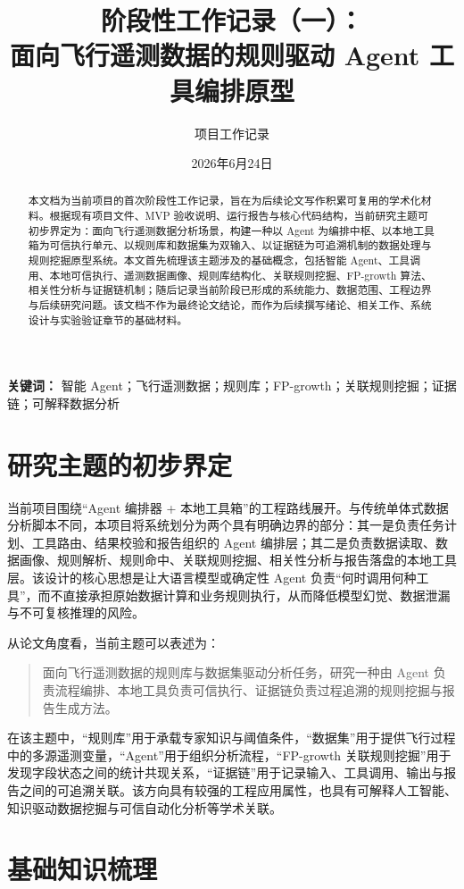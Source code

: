 \documentclass[UTF8,a4paper,zihao=-4]{ctexart}
\title{阶段性工作记录（一）：\\面向飞行遥测数据的规则驱动 Agent 工具编排原型}
\author{项目工作记录}
\date{2026年6月24日}
\begin{document}
\maketitle

\begin{abstract}
本文档为当前项目的首次阶段性工作记录，旨在为后续论文写作积累可复用的学术化材料。根据现有项目文件、MVP 验收说明、运行报告与核心代码结构，当前研究主题可初步界定为：面向飞行遥测数据分析场景，构建一种以 Agent 为编排中枢、以本地工具箱为可信执行单元、以规则库和数据集为双输入、以证据链为可追溯机制的数据处理与规则挖掘原型系统。本文首先梳理该主题涉及的基础概念，包括智能 Agent、工具调用、本地可信执行、遥测数据画像、规则库结构化、关联规则挖掘、FP-growth 算法、相关性分析与证据链机制；随后记录当前阶段已形成的系统能力、数据范围、工程边界与后续研究问题。该文档不作为最终论文结论，而作为后续撰写绪论、相关工作、系统设计与实验验证章节的基础材料。
\end{abstract}

\noindent\textbf{关键词：} 智能 Agent；飞行遥测数据；规则库；FP-growth；关联规则挖掘；证据链；可解释数据分析

\section{研究主题的初步界定}

当前项目围绕“Agent 编排器 + 本地工具箱”的工程路线展开。与传统单体式数据分析脚本不同，本项目将系统划分为两个具有明确边界的部分：其一是负责任务计划、工具路由、结果校验和报告组织的 Agent 编排层；其二是负责数据读取、数据画像、规则解析、规则命中、关联规则挖掘、相关性分析与报告落盘的本地工具层。该设计的核心思想是让大语言模型或确定性 Agent 负责“何时调用何种工具”，而不直接承担原始数据计算和业务规则执行，从而降低模型幻觉、数据泄漏与不可复核推理的风险。

从论文角度看，当前主题可以表述为：
\begin{quote}
面向飞行遥测数据的规则库与数据集驱动分析任务，研究一种由 Agent 负责流程编排、本地工具负责可信执行、证据链负责过程追溯的规则挖掘与报告生成方法。
\end{quote}

在该主题中，“规则库”用于承载专家知识与阈值条件，“数据集”用于提供飞行过程中的多源遥测变量，“Agent”用于组织分析流程，“FP-growth 关联规则挖掘”用于发现字段状态之间的统计共现关系，“证据链”用于记录输入、工具调用、输出与报告之间的可追溯关联。该方向具有较强的工程应用属性，也具有可解释人工智能、知识驱动数据挖掘与可信自动化分析等学术关联。

\section{基础知识梳理}
\end{document}
